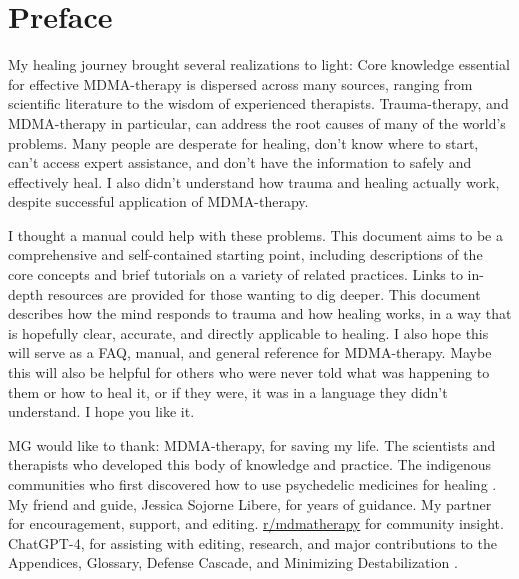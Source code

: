 \documentclass[12pt,letterpaper]{article}
\begin{document}
\section*{Preface}

My healing journey brought several realizations to light: Core knowledge essential for effective MDMA-therapy is dispersed across many sources, ranging from scientific literature to the wisdom of experienced therapists. Trauma-therapy, and MDMA-therapy in particular, can address the root causes of many of the world's problems. Many people are desperate for healing, don't know where to start, can't access expert assistance, and don't have the information to safely and effectively heal. I also didn't understand how trauma and healing actually work, despite successful application of MDMA-therapy. 

I thought a manual could help with these problems. This document aims to be a comprehensive and self-contained starting point, including descriptions of the core concepts and brief tutorials on a variety of related practices. Links to in-depth resources are provided for those wanting to dig deeper. This document describes how the mind responds to trauma and how healing works, in a way that is hopefully clear, accurate, and directly applicable to healing. I also hope this will serve as a FAQ, manual, and general reference for MDMA-therapy. Maybe this will also be helpful for others who were never told what was happening to them or how to heal it, or if they were, it was in a language they didn't understand. I hope you like it.

MG would like to thank: MDMA-therapy, for saving my life. The scientists and therapists who developed this body of knowledge and practice. The indigenous communities who first discovered how to use psychedelic medicines for healing \cite{davisOneRiver}. My friend and guide, Jessica Sojorne Libere, for years of guidance. My partner for encouragement, support, and editing. \href{https://www.reddit.com/r/mdmatherapy}{r/mdmatherapy} for community insight. ChatGPT-4, for assisting with editing, research, and major contributions to the Appendices, Glossary, Defense Cascade, and Minimizing Destabilization \cite{openaiGPT}.
\end{document}
